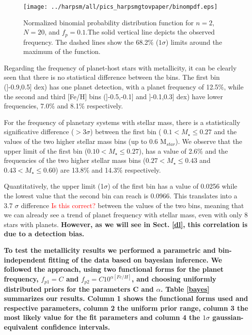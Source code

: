 \documentclass[structabstract]{aa}
\begin{document}
\begin{figure}[h]
\begin{center}
\texttt{[image: ../harpsm/all/pics\_harpsmgtovpaper/binompdf.eps]}
\end{center}
\caption{Normalized binomial probability distribution function for $n=2$, $N=20$, and $f_{p} = 0.1$.The solid vertical line depicts the observed frequency. The dashed lines show the 68.2\% ($1\sigma$) limits around the maximum of the function.}
\label{binompdf}
\end{figure}

Regarding the frequency of planet-host stars with metallicity, it can be clearly seen that there is no statistical difference between the bins. The first bin (]-0.9,0.5] dex) has one planet detection, with a planet frequency of 12.5\%, while the second and third [Fe/H] bins (]-0.5,-0.1] and ]-0.1,0.3] dex) have lower frequencies, 7.0\% and 8.1\% respectively. 



For the frequency of planetary systems with stellar mass, there is a statistically significative difference ($> 3\sigma$)  between the first bin ( $0.1 < M_{\star} \le 0.27$ and the values of the two higher stellar mass bins (up to 0.6 M$_{star}$). We observe that the upper limit of the first bin ($0.10 < M_{\star} \le 0.27$), has a value of  2.6\% and the frequencies of the two higher stellar mass bins ($0.27 < M_{\star} \le 0.43$ and $0.43 < M_{\star} \le 0.60$) are 13.8\% and 14.3\% respectively.


Quantitatively, the upper limit (1$\sigma$) of the first bin has a value of 0.0256 while the lowest value that the second bin can reach is 0.0966. This translates into a 3.7 $\sigma$ difference \textcolor{red}{Is this correct?} between the values of the two bins, meaning that we can already see a trend of planet frequency with stellar mass, even with only 8 stars with planets. \textbf{However, as we will see in Sect. \ref{dl}, this correlation is due to a detection bias.}


\textbf{To test the metallicity results we performed a parametric and bin-independent fitting of the data based on bayesian inference. We followed the \citet{Johnson-2010} approach, using two functional forms for the planet frequency, $f_{p1} = C$ and $f_{p2} = C10^{\alpha [Fe/H]}$, and choosing uniformly distributed priors for the parameters C and $\alpha$. Table \ref{bayes} summarizes our results. Column 1 shows the functional forms used and respective parameters, column 2 the uniform prior range, column 3 the most likely value for the fit parameters and column 4 the $1\sigma$ gaussian-equivalent confidence intervals.} 
\end{document}
